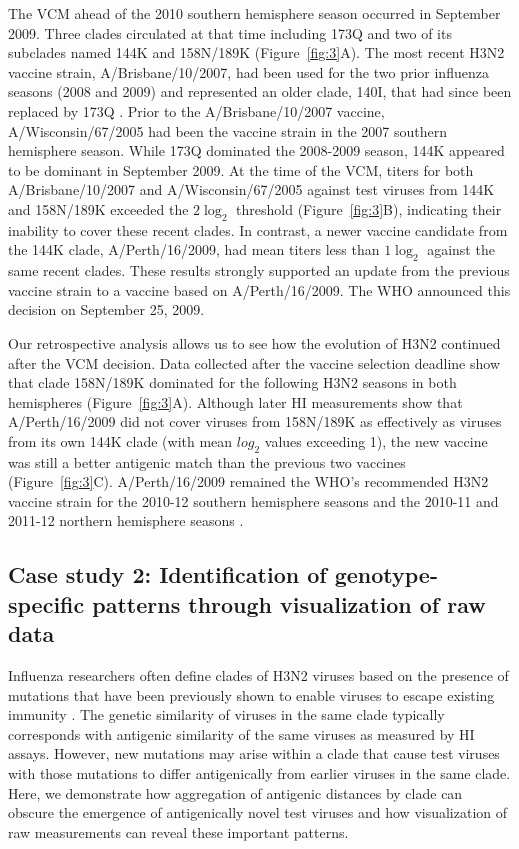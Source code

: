 \documentclass[utf8]{FrontiersinHarvard} %
\begin{document}
The VCM ahead of the 2010 southern hemisphere season occurred in September 2009.
Three clades circulated at that time including 173Q and two of its subclades named 144K and 158N/189K (Figure~\ref{fig:3}A).
The most recent H3N2 vaccine strain, A/Brisbane/10/2007, had been used for the two prior influenza seasons (2008 and 2009) and represented an older clade, 140I, that had since been replaced by 173Q \citep{WHO:archive}.
Prior to the A/Brisbane/10/2007 vaccine, A/Wisconsin/67/2005 had been the vaccine strain in the 2007 southern hemisphere season.
While 173Q dominated the 2008-2009 season, 144K appeared to be dominant in September 2009.
At the time of the VCM, titers for both A/Brisbane/10/2007 and A/Wisconsin/67/2005 against test viruses from 144K and 158N/189K exceeded the $2\log_{2}$ threshold (Figure~\ref{fig:3}B), indicating their inability to cover these recent clades.
In contrast, a newer vaccine candidate from the 144K clade, A/Perth/16/2009, had mean titers less than $1\log_{2}$ against the same recent clades.
These results strongly supported an update from the previous vaccine strain to a vaccine based on A/Perth/16/2009.
The WHO announced this decision on September 25, 2009.

Our retrospective analysis allows us to see how the evolution of H3N2 continued after the VCM decision.
Data collected after the vaccine selection deadline show that clade 158N/189K dominated for the following H3N2 seasons in both hemispheres (Figure~\ref{fig:3}A).
Although later HI measurements show that A/Perth/16/2009 did not cover viruses from 158N/189K as effectively as viruses from its own 144K clade (with mean $log_{2}$ values exceeding 1), the new vaccine was still a better antigenic match than the previous two vaccines (Figure~\ref{fig:3}C).
A/Perth/16/2009 remained the WHO's recommended H3N2 vaccine strain for the 2010-12 southern hemisphere seasons and the 2010-11 and 2011-12 northern hemisphere seasons \citep{WHO:recent}.

\subsection{Case study 2: Identification of genotype-specific patterns through visualization of raw data}

Influenza researchers often define clades of H3N2 viruses based on the presence of mutations that have been previously shown to enable viruses to escape existing immunity \citep{Wolf:2006da,Shih:2007bd,Koel:2013jz}.
The genetic similarity of viruses in the same clade typically corresponds with antigenic similarity of the same viruses as measured by HI assays.
However, new mutations may arise within a clade that cause test viruses with those mutations to differ antigenically from earlier viruses in the same clade.
Here, we demonstrate how aggregation of antigenic distances by clade can obscure the emergence of antigenically novel test viruses and how visualization of raw measurements can reveal these important patterns.
\end{document}
